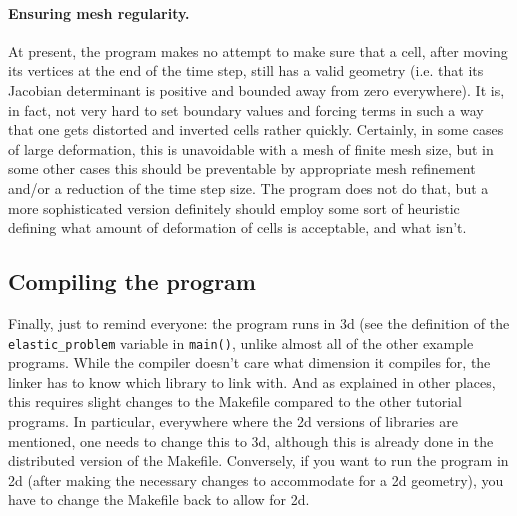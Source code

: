 \documentclass{article}
\begin{document}
\paragraph*{Ensuring mesh regularity.} At present, the program makes no attempt
to make sure that a cell, after moving its vertices at the end of the time
step, still has a valid geometry (i.e. that its Jacobian determinant is
positive and bounded away from zero everywhere). It is, in fact, not very hard
to set boundary values and forcing terms in such a way that one gets distorted
and inverted cells rather quickly. Certainly, in some cases of large
deformation, this is unavoidable with a mesh of finite mesh size, but in some
other cases this should be preventable by appropriate mesh refinement and/or a
reduction of the time step size. The program does not do that, but a more
sophisticated version definitely should employ some sort of heuristic defining
what amount of deformation of cells is acceptable, and what isn't.


\subsection*{Compiling the program}

Finally, just to remind everyone: the program runs in 3d (see the definition
of the \texttt{elastic\_problem} variable in \texttt{main()}, unlike almost
all of the other example programs. While the compiler doesn't care what
dimension it compiles for, the linker has to know which library to link with.
And as explained in other places, this requires slight changes to the Makefile
compared to the other tutorial programs. In particular, everywhere where the
2d versions of libraries are mentioned, one needs to change this to 3d,
although this is already done in the distributed version of the Makefile.
Conversely, if you want to run the program in 2d (after making the necessary
changes to accommodate for a 2d geometry), you have to change the Makefile
back to allow for 2d.
\end{document}
